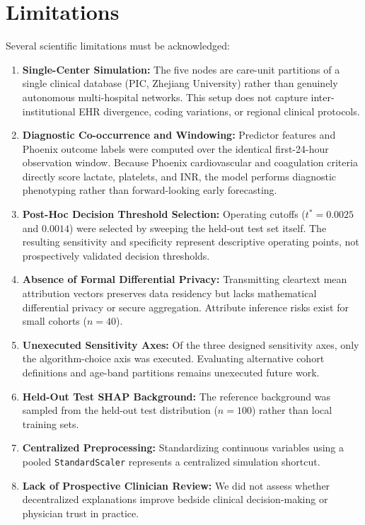 \documentclass[runningheads]{llncs}
\begin{document}
\section{Limitations}\label{sec:limitations}

Several scientific limitations must be acknowledged:
\begin{enumerate}
\item \textbf{Single-Center Simulation:} The five nodes are care-unit partitions of a single clinical database (PIC, Zhejiang University) rather than genuinely autonomous multi-hospital networks. This setup does not capture inter-institutional EHR divergence, coding variations, or regional clinical protocols.
\item \textbf{Diagnostic Co-occurrence and Windowing:} Predictor features and Phoenix outcome labels were computed over the identical first-24-hour observation window. Because Phoenix cardiovascular and coagulation criteria directly score lactate, platelets, and INR, the model performs diagnostic phenotyping rather than forward-looking early forecasting.
\item \textbf{Post-Hoc Decision Threshold Selection:} Operating cutoffs ($t^* = 0.0025$ and $0.0014$) were selected by sweeping the held-out test set itself. The resulting sensitivity and specificity represent descriptive operating points, not prospectively validated decision thresholds.
\item \textbf{Absence of Formal Differential Privacy:} Transmitting cleartext mean attribution vectors preserves data residency but lacks mathematical differential privacy or secure aggregation. Attribute inference risks exist for small cohorts ($n=40$).
\item \textbf{Unexecuted Sensitivity Axes:} Of the three designed sensitivity axes, only the algorithm-choice axis was executed. Evaluating alternative cohort definitions and age-band partitions remains unexecuted future work.
\item \textbf{Held-Out Test SHAP Background:} The reference background was sampled from the held-out test distribution ($n=100$) rather than local training sets.
\item \textbf{Centralized Preprocessing:} Standardizing continuous variables using a pooled \texttt{StandardScaler} represents a centralized simulation shortcut.
\item \textbf{Lack of Prospective Clinician Review:} We did not assess whether decentralized explanations improve bedside clinical decision-making or physician trust in practice.
\end{enumerate}
\end{document}
